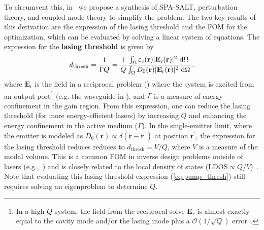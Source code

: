 To circumvent this, in~\cite{ownpub4} we propose a synthesis of SPA-SALT, perturbation theory, and coupled mode theory to simplify the problem. 
The two key results of this derivation are the expression of the lasing threshold and the FOM for the optimization, which can be evaluated by solving a linear system of equations.
The expression for the \textbf{lasing threshold} is given by~\cite{ownpub4}
\begin{equation}\label{eq:pump_thresh}
 d_\text{thresh} = \frac{1}{\Gamma Q} = \frac{1}{Q} \frac{\int_{\Omega} \varepsilon_c(\mathbf{r})|\mathbf{E}_{\text{r}}(\mathbf{r})|^2\, \mathop{}\!\text{d} \Omega}{\int_{\Omega} D_0(\mathbf{r}) |\mathbf{E}_{\text{r}}(\mathbf{r})|^2\, \mathop{}\!\text{d} \Omega}\,.
\end{equation}
where $\mathbf{E}_\text{r}$ is the field in a reciprocal problem () where the system is excited from an output port\footnote{In a high-$Q$ system, the field from the reciprocal solve $\mathbf{E}_r$ is almost exactly equal to the cavity mode and/or the lasing mode plus a $\mathcal{O}(1/\sqrt{Q})$ error~\cite{phot_crys}.} (e.g. the waveguide in ), and $\Gamma$ is a measure 
of energy confinement in the gain region. From this expression, one can reduce the lasing threshold (for more energy-efficient lasers) by increasing $Q$ and enhancing the energy confinement in the
active medium ($\Gamma$). In the single-emitter limit, where the emitter is modeled as 
\(D_0(\mathbf{r}) \propto \delta(\mathbf{r} - \mathbf{r}^\prime)\) at position \(\mathbf{r}^\prime\), 
the expression for the lasing threshold reduces  reduces to \(d_{\text{thresh}} = V / Q\), where $V$ is a measure of the modal volume. This is a common FOM in inverse design problems outside of lasers (e.g.,~\cite{LDOS_opt_wang}) and is closely
related to the local density of states ($ \text{LDOS} \propto Q/V$)~\cite{LDOS_opt_wang}.
   Note that evaluating this lasing threshold expression (\eqref{eq:pump_thresh}) still requires solving an eigenproblem to determine \(Q\).



